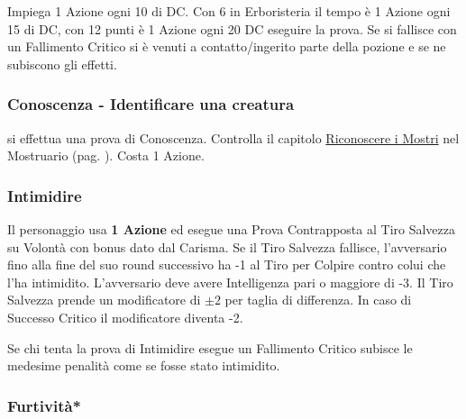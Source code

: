 \begin{multicols}{2}
Impiega 1 Azione ogni 10 di DC. Con 6 in Erboristeria il tempo è 1 Azione ogni 15 di DC, con 12 punti è 1 Azione ogni 20 DC eseguire la prova. Se si fallisce con un Fallimento Critico si è venuti a contatto/ingerito parte della pozione e se ne subiscono gli effetti.

\titlespacing*{\subsubsection}{0pt}{0.5em}{0.5em}\subsubsection*{Conoscenza - Identificare una creatura} \label{riconosceremostro}\hypertarget{riconosceremostro}{}
si effettua una prova di Conoscenza. Controlla il capitolo \hyperlink{riconoscereimostri}{Riconoscere i Mostri} nel Mostruario (pag. \pageref{riconoscereimostri}). Costa 1 Azione.

\titlespacing*{\subsubsection}{0pt}{0.5em}{0.5em}\subsubsection*{Intimidire}\label{intimidire}
Il personaggio usa \textbf{1 Azione} ed esegue una Prova Contrapposta al Tiro Salvezza su Volontà con bonus dato dal Carisma.
Se il Tiro Salvezza fallisce, l'avversario fino alla fine del suo round successivo ha -1 al Tiro per Colpire contro colui che l'ha intimidito. L'avversario deve avere Intelligenza pari o maggiore di -3. Il Tiro Salvezza prende un modificatore di $\pm2$ per taglia di differenza. In caso di Successo Critico il modificatore diventa -2.

Se chi tenta la prova di Intimidire esegue un Fallimento Critico subisce le medesime penalità come se fosse stato intimidito.


%

\titlespacing*{\subsubsection}{0pt}{0.5em}{0.5em}\subsubsection*{Furtività*}  \label{furtivita}


\end{multicols}
